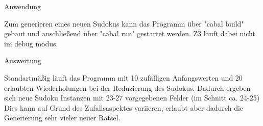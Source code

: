 \vspace{2ex}

\begin{Large}
    Anwendung
\end{Large}
\vspace{2ex}

Zum generieren eines neuen Sudokus kann das Programm über "cabal build" gebaut und anschließend über "cabal run" gestartet werden. Z3 läuft dabei nicht im debug modus.

\vspace{2ex}

\begin{Large}
    Auswertung
\end{Large}
\vspace{2ex}

Standartmäßig läuft das Programm mit 10 zufälligen Anfangswerten und 20 erlaubten Wiederholungen bei der Reduzierung des Sudokus.
Dadurch ergeben sich neue Sudoku Instanzen mit 23-27 vorgegebenen Felder (im Schnitt ca. 24-25) Dies kann auf Grund des Zufallsaspektes variieren, erlaubt aber dadurch die Generierung sehr vieler neuer Rätsel.



